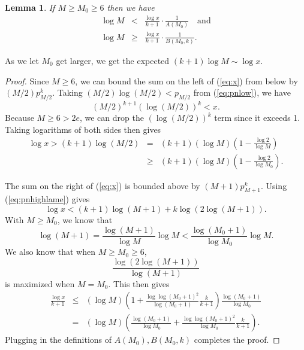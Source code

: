\documentclass[11pt]{amsart}
\newtheorem{lem}[thm]{Lemma}
\numberwithin{equation}{section}
\numberwithin{algorithm}{section}
\begin{document}
\begin{lem}\label{lemma:logm}
If $M\ge M_0\ge 6$ then we have
\begin{eqnarray*}
\log M &<& \frac{\log x}{k+1} \cdot \frac{1}{A(M_0)} \quad \mbox{and}\\
\log M &\ge& \frac{\log x}{k+1}\cdot \frac{1}{B(M_0,k)} .
\end{eqnarray*}
\end{lem}
As we let $M_0$ get larger, we get the expected
$(k+1)\log M\sim \log x$.
\begin{proof}
Since $M\ge 6$, we can bound the sum on the left of (\ref{eq:x}) from below by $(M/2) p_{M/2}^k$.
Taking $(M/2)\log (M/2)<p_{M/2}$ from (\ref{eq:pnlow}), we have
$$
(M/2)^{k+1} ( \log (M/2) )^k < x.
$$
Because $M\ge 6 > 2e$, we can drop the
  $(\log (M/2))^k$ term since it exceeds 1.
Taking logarithms of both sides then gives 
\begin{eqnarray*}
\log x > (k+1)\log (M/2) 
&=& (k+1)(\log M)\left(1 - \frac{\log 2}{\log M}\right)\\
&\ge&(k+1)(\log M)\left(1 - \frac{\log 2}{\log M_0}\right).
\end{eqnarray*}

The sum on the right of (\ref{eq:x}) is bounded above by $(M+1) p_{M+1}^k$.
Using (\ref{eq:pnhighlame}) gives
$$
\log x < (k+1)\log(M+1)+ k\log (2\log (M+1)).
$$
With $M\ge M_0$, we know that 
\begin{equation} \label{eq:logm1}
\log(M+1)= \frac{\log (M+1)}{\log M}\log M 
  < \frac{\log (M_0+1)}{\log M_0}\log M.
\end{equation}
We also know that when $M\ge M_0\ge 6$,
$$
\frac{\log (2\log (M+1))}{\log (M+1)}
$$
is maximized when $M=M_0$.
This then gives
\begin{eqnarray*}
\frac{\log x}{k+1} &\le&  (\log M)
  \left(1+ \frac{\log\log(M_0+1)^2}{\log (M_0+1)} \frac{k}{k+1}  \right)\frac{\log (M_0+1)}{\log M_0} \\
  &=&(\log M)\left(\frac{\log (M_0+1)}{\log M_0}+
  \frac{\log\log(M_0+1)^2}{\log M_0} \frac{k}{k+1}
  \right).
\end{eqnarray*}
Plugging in the definitions of $A(M_0),B(M_0,k)$ completes the proof.
\end{proof}
\end{document}
